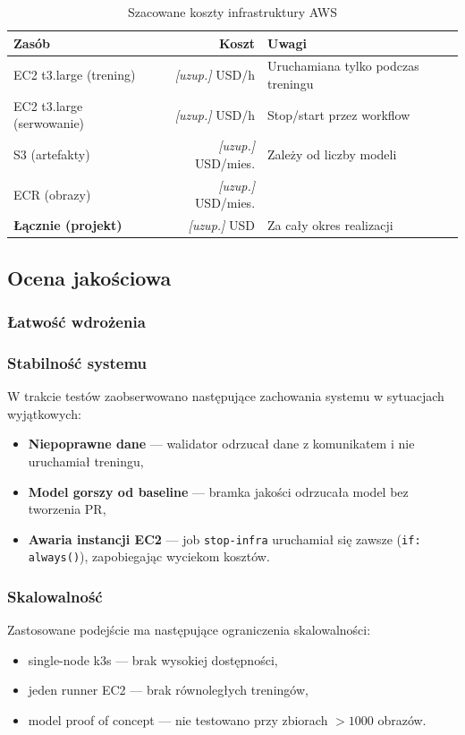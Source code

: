 \begin{table}[H]
\centering
\caption{Szacowane koszty infrastruktury AWS}
\label{tab:koszty}
\begin{tabular}{|l|r|l|}
\hline
\textbf{Zasób} & \textbf{Koszt} & \textbf{Uwagi} \\
\hline
EC2 t3.large (trening) & \textit{[uzup.]} USD/h & Uruchamiana tylko podczas treningu \\
EC2 t3.large (serwowanie) & \textit{[uzup.]} USD/h & Stop/start przez workflow \\
S3 (artefakty) & \textit{[uzup.]} USD/mies. & Zależy od liczby modeli \\
ECR (obrazy) & \textit{[uzup.]} USD/mies. & \\
\hline
\textbf{Łącznie (projekt)} & \textit{[uzup.]} USD & Za cały okres realizacji \\
\hline
\end{tabular}
\end{table}

\subsection{Ocena jakościowa}

\subsubsection{Łatwość wdrożenia}


\subsubsection{Stabilność systemu}

W trakcie testów zaobserwowano następujące zachowania systemu w sytuacjach wyjątkowych:
\begin{itemize}
  \item \textbf{Niepoprawne dane} --- walidator odrzucał dane z komunikatem i nie uruchamiał treningu,
  \item \textbf{Model gorszy od baseline} --- bramka jakości odrzucała model bez tworzenia PR,
  \item \textbf{Awaria instancji EC2} --- job \texttt{stop-infra} uruchamiał się zawsze (\texttt{if: always()}), zapobiegając wyciekom kosztów.
\end{itemize}

\subsubsection{Skalowalność}

Zastosowane podejście ma następujące ograniczenia skalowalności:
\begin{itemize}
  \item single-node k3s --- brak wysokiej dostępności,
  \item jeden runner EC2 --- brak równoległych treningów,
  \item model proof of concept --- nie testowano przy zbiorach $>1000$ obrazów.
\end{itemize}
